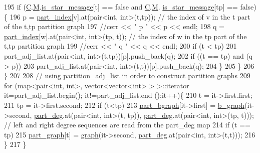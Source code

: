 \begin{DoxyCode}
195       \textcolor{keywordflow}{if} (\hyperlink{classmarked__graph__encoder_af82bc0653414091291cb75553a407bdb}{C}.\hyperlink{classcolored__graph_ab72c568fe12f7c849ca6bffb145aec47}{M}.\hyperlink{classgraph__message_a55ff5531a0043106369e84a7bc45e22d}{is\_star\_message}[t] == \textcolor{keyword}{false} and \hyperlink{classmarked__graph__encoder_af82bc0653414091291cb75553a407bdb}{C}.\hyperlink{classcolored__graph_ab72c568fe12f7c849ca6bffb145aec47}{M}.
      \hyperlink{classgraph__message_a55ff5531a0043106369e84a7bc45e22d}{is\_star\_message}[tp] == \textcolor{keyword}{false})\{
196         p = \hyperlink{classmarked__graph__encoder_a1d3e2b90f5d46244fd4cb33c69ac81f1}{part\_index}[v].at(pair<int, int>(t,tp)); \textcolor{comment}{// the index of v in the t part of the t,tp
       partition graph}
197         \textcolor{comment}{//cerr << " p " << p << endl;}
198         q = \hyperlink{classmarked__graph__encoder_a1d3e2b90f5d46244fd4cb33c69ac81f1}{part\_index}[w].at(pair<int, int>(tp, t)); \textcolor{comment}{// the index of w in the tp part of the t,tp
       partition graph}
199         \textcolor{comment}{//cerr << " q " << q << endl;}
200         \textcolor{keywordflow}{if} (t < tp)
201           part\_adj\_list.at(pair<int, int>(t,tp))[p].push\_back(q);
202         \textcolor{keywordflow}{if} ((t == tp) and (q > p))
203           part\_adj\_list.at(pair<int, int>(t,t))[p].push\_back(q);
204       \}
205     \}
206   \}
207 
208   \textcolor{comment}{// using partition\_adj\_list in order to construct partition graphs}
209   \textcolor{keywordflow}{for} (map<pair<int, int>, vector<vector<int> > >::iterator it=part\_adj\_list.begin(); it!=part\_adj\_list.end
      ();it++)\{
210     t = it->first.first;
211     tp = it->first.second;
212     \textcolor{keywordflow}{if} (t<tp)
213       \hyperlink{classmarked__graph__encoder_a5faebef707fb681c0b6c2ccf64abc04c}{part\_bgraph}[it->first] = \hyperlink{classb__graph}{b\_graph}(it->second, \hyperlink{classmarked__graph__encoder_a55ea2edb2609dfc287432f61900d6ad1}{part\_deg}.at(pair<int, int>(t,
      tp)), \hyperlink{classmarked__graph__encoder_a55ea2edb2609dfc287432f61900d6ad1}{part\_deg}.at(pair<int, int>(tp, t))); \textcolor{comment}{// left and right degree sequences are read from the
       part\_deg map}
214     \textcolor{keywordflow}{if} (t == tp)
215       \hyperlink{classmarked__graph__encoder_adbafd0769ae301acc1b2c19b5e1d4844}{part\_graph}[t] = \hyperlink{classgraph}{graph}(it->second, \hyperlink{classmarked__graph__encoder_a55ea2edb2609dfc287432f61900d6ad1}{part\_deg}.at(pair<int, int>(t,t)));
216   \}
217 \}
\end{DoxyCode}
\mbox{\label{classmarked__graph__encoder_a1cb2cd754108302a0437a924dc70bc0e}} 
